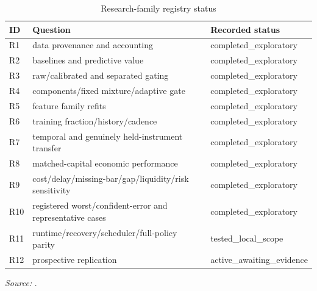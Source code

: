 \documentclass[11pt,a4paper]{article}
\begin{document}
\begin{table}[!htbp]\centering\footnotesize\setlength{\tabcolsep}{3pt}\renewcommand{\arraystretch}{1.14}
\caption{Research-family registry status}\label{tab:22}
\begin{tabular}{@{}>{\raggedright\arraybackslash}p{}>{\raggedright\arraybackslash}p{}>{\raggedright\arraybackslash}p{}@{}}
\toprule
\textbf{ID} & \textbf{Question} & \textbf{Recorded status} \\
\midrule
R1 & data provenance and accounting & completed\_\allowbreak{}exploratory \\
R2 & baselines and predictive value & completed\_\allowbreak{}exploratory \\
R3 & raw/\allowbreak{}calibrated and separated gating & completed\_\allowbreak{}exploratory \\
R4 & components/\allowbreak{}fixed mixture/\allowbreak{}adaptive gate & completed\_\allowbreak{}exploratory \\
R5 & feature family refits & completed\_\allowbreak{}exploratory \\
R6 & training fraction/\allowbreak{}history/\allowbreak{}cadence & completed\_\allowbreak{}exploratory \\
R7 & temporal and genuinely held-instrument transfer & completed\_\allowbreak{}exploratory \\
R8 & matched-capital economic performance & completed\_\allowbreak{}exploratory \\
R9 & cost/\allowbreak{}delay/\allowbreak{}missing-bar/\allowbreak{}gap/\allowbreak{}liquidity/\allowbreak{}risk sensitivity & completed\_\allowbreak{}exploratory \\
R10 & registered worst/\allowbreak{}confident-error and representative cases & completed\_\allowbreak{}exploratory \\
R11 & runtime/\allowbreak{}recovery/\allowbreak{}scheduler/\allowbreak{}full-policy parity & tested\_\allowbreak{}local\_\allowbreak{}scope \\
R12 & prospective replication & active\_\allowbreak{}awaiting\_\allowbreak{}evidence \\
\bottomrule\end{tabular}\par\smallskip
\raggedright\textit{Source:} .
\end{table}
\end{document}
